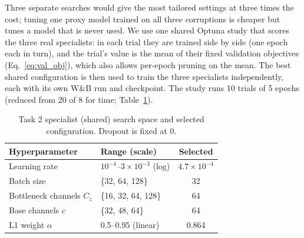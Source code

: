 \documentclass[conference]{IEEEtran}
\begin{document}
Three separate searches would give the most tailored settings at three
times the cost; tuning one proxy model trained on all three corruptions is
cheaper but tunes a model that is never used. We use one shared Optuna study
that scores the three real specialists: in each trial they are trained side
by side (one epoch each in turn), and the trial's value is the mean of their
fixed validation objectives (Eq.~\eqref{eq:val_obj}), which also allows
per-epoch pruning on the mean. The best shared configuration is then used to
train the three specialists independently, each with its own W\&B run and
checkpoint. The study runs 10 trials of 5 epochs (reduced from 20 of 8 for
time; Table~\ref{tab:task2_spec_space}).

\begin{table}[t]
\centering
\caption{Task 2 specialist (shared) search space and selected configuration.
Dropout is fixed at 0.}
\label{tab:task2_spec_space}
\footnotesize
\begin{tabular}{llc}
\toprule
Hyperparameter & Range (scale) & Selected \\
\midrule
Learning rate & $10^{-4}$--$3\times10^{-3}$ (log) & $4.7\times10^{-4}$ \\
Batch size & \{32, 64, 128\} & 32 \\
Bottleneck channels $C_z$ & \{16, 32, 64, 128\} & 64 \\
Base channels $c$ & \{32, 48, 64\} & 64 \\
L1 weight $\alpha$ & 0.5--0.95 (linear) & 0.864 \\
\bottomrule
\end{tabular}
\\[3pt]
\end{table}
\end{document}
